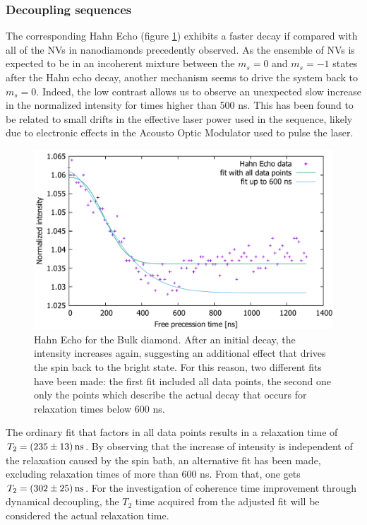 \documentclass[12pt,a4paper]{article}
\begin{document}
\subsubsection{Decoupling sequences}  
The corresponding Hahn Echo (figure \ref{bh}) exhibits a faster decay if compared with all of the NVs in nanodiamonds precedently observed.
As the ensemble of NVs is expected to be in an incoherent mixture between the $m_s=0$ and $m_s=-1$ states after the Hahn echo decay, another mechanism seems to drive the system back to $m_s=0$. Indeed, the low contrast allows us to observe an unexpected slow increase in the normalized intensity for times higher than 500 ns. This has been found to be related to small drifts in the effective laser power used in the sequence, likely due to electronic effects in the Acousto Optic Modulator used to pulse the laser. 
\begin{figure}[H]
\includegraphics[scale=0.6]{bulkhahn.pdf} 
\caption{Hahn Echo for the Bulk diamond. After an initial decay, the intensity increases again, suggesting an additional effect that drives the spin back to the bright state. For this reason, two different fits have been made: the first fit included all data points, the second one only the points which describe the actual decay that occurs for relaxation times below 600 ns.}
\label{bh}
\end{figure}
The ordinary fit that factors in all data points results in a relaxation time of $T_2=\unit[(235\pm 13)]{ns}$. By observing that the increase of intensity is independent of the relaxation caused by the spin bath, an alternative fit has been made, excluding relaxation times of more than 600 ns. From that, one gets $T_2=\unit[(302\pm 25)]{ns}$. For the investigation of coherence time improvement through dynamical decoupling, the $T_2$ time acquired from the adjusted fit will be considered the actual relaxation time.
\end{document}
